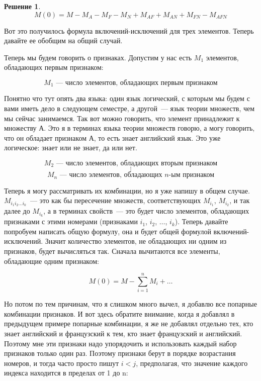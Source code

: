 \documentclass[russian]{lecture-notes}
\theoremstyle{definition}
\newtheorem*{solution}{Решение}
\begin{document}
\begin{enumerate}
\begin{solution}
			\[
				M(0) = M - M_A - M_F - M_N + M_{AF} + M_{AN} + M_{FN} - M_{AFN}
			\]
			
			Вот это получилось формула включений-исключений для трех элементов. Теперь давайте ее обобщим на общий случай.
			
		\end{solution}
	
		Теперь мы будем говорить о признаках. Допустим у нас есть $M_1$ элементов, обладающих первым признаком:
		
		\[
			M_1 \text{~--- число элементов, обладающих первым признаком}
		\]
		
		Понятно что тут опять два языка: один язык логический, с которым мы будем с вами иметь дело в следующем семестре, а другой~--- язык теории множеств, чем мы сейчас занимаемся. Так вот можно говорить, что элемент принадлежит к множеству А. Это я в терминах языка теории множеств говорю, а могу говорить, что он обладает признаком А, то есть знает английский язык. Это уже логическое: знает или не знает, да или нет.
		
		\[
			M_2 \text{~--- число элементов, обладающих вторым признаком}
		\]
		\[
			\vdots
		\]
		\[
			M_n \text{~--- число элементов, обладающих $n$-ым признаком}
		\]
		
		Теперь я могу рассматривать их комбинации, но я уже напишу в общем случае. $M_{i_1i_2...i_k}$~--- это как бы пересечение множеств, соответствующих $M_{i_1}$, $M_{i_2}$, и так далее до $M_{i_k}$, а в терминах свойств~--- это будет число элементов, обладающих признаками с этими номерами (признаками $i_1$, $i_2$, $\ldots$, $i_k$). Теперь давайте попробуем написать общую формулу, она и будет общей формулой включений-исключений. Значит количество элементов, не обладающих ни одним из признаков, будет вычисляться так. Сначала вычитаются все элементы, обладающие одним признаком:
		
		\[
			M(0) = M - \sum_{i=1}^{n}M_i + \ldots
		\]
		
		Но потом по тем причинам, что я слишком много вычел, я добавлю все попарные комбинации признаков. И вот здесь обратите внимание, когда я добавлял в предыдущем примере попарные комбинации, я же не добавлял отдельно тех, кто знает английский и французский к тем, кто знает французский и английский. Поэтому мне эти признаки надо упорядочить и использовать каждый набор признаков только один раз. Поэтому признаки берут в порядке возрастания номеров, и тогда часто просто пишут $i < j$, предполагая, что значение каждого индекса находится в пределах от 1 до n:
		

\end{enumerate}
\end{document}
